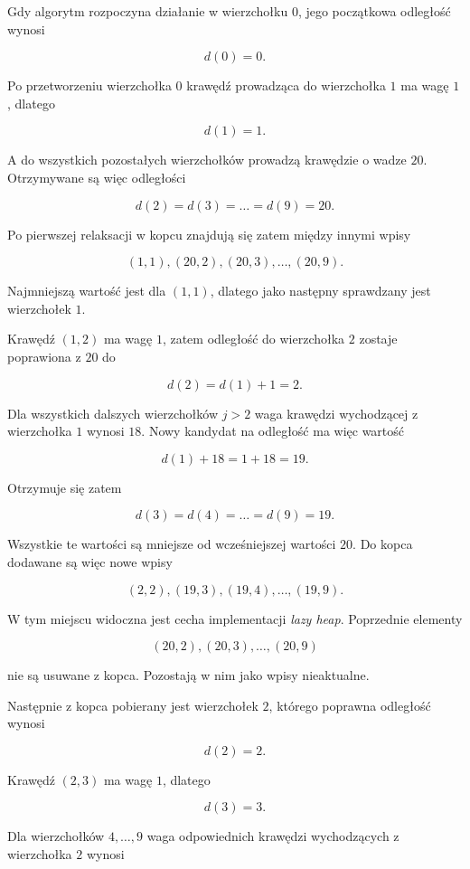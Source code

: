 Gdy algorytm rozpoczyna działanie w wierzchołku \(0\), jego początkowa odległość wynosi

\[
d(0)=0.
\]

\noindent
Po przetworzeniu wierzchołka \(0\) krawędź prowadząca do wierzchołka
\(1\) ma wagę \(1\), dlatego

\[
d(1)=1.
\]

\noindent
A do wszystkich pozostałych wierzchołków prowadzą krawędzie o wadze \(20\). Otrzymywane są więc odległości

\[
d(2)=d(3)=\ldots=d(9)=20.
\]

\noindent
Po pierwszej relaksacji w kopcu znajdują się zatem między innymi wpisy

\[
(1,1),(20,2),(20,3),\ldots,(20,9).
\]

\noindent
Najmniejszą wartość jest dla \((1,1)\), dlatego jako następny sprawdzany jest wierzchołek \(1\).

\newpage
\noindent
Krawędź \((1,2)\) ma wagę \(1\), zatem odległość do wierzchołka \(2\) zostaje poprawiona z \(20\) do

\[
d(2)=d(1)+1=2.
\]

\noindent
Dla wszystkich dalszych wierzchołków \(j>2\) waga krawędzi wychodzącej z wierzchołka \(1\) wynosi \(18\). Nowy kandydat na odległość ma więc wartość

\[
d(1)+18=1+18=19.
\]

\noindent
Otrzymuje się zatem

\[
d(3)=d(4)=\ldots=d(9)=19.
\]

\noindent
Wszystkie te wartości są mniejsze od wcześniejszej wartości \(20\). Do kopca dodawane są więc nowe wpisy

\[
(2,2),(19,3),(19,4),\ldots,(19,9).
\]

\noindent
W tym miejscu widoczna jest cecha implementacji \textit{lazy heap}. Poprzednie elementy

\[
(20,2),(20,3),\ldots,(20,9)
\]

\noindent
nie są usuwane z kopca. Pozostają w nim jako wpisy nieaktualne.

Następnie z kopca pobierany jest wierzchołek \(2\), którego poprawna odległość wynosi

\[
d(2)=2.
\]

\noindent
Krawędź \((2,3)\) ma wagę \(1\), dlatego

\[
d(3)=3.
\]

\noindent
Dla wierzchołków \(4,\ldots,9\) waga odpowiednich krawędzi wychodzących z wierzchołka \(2\) wynosi

